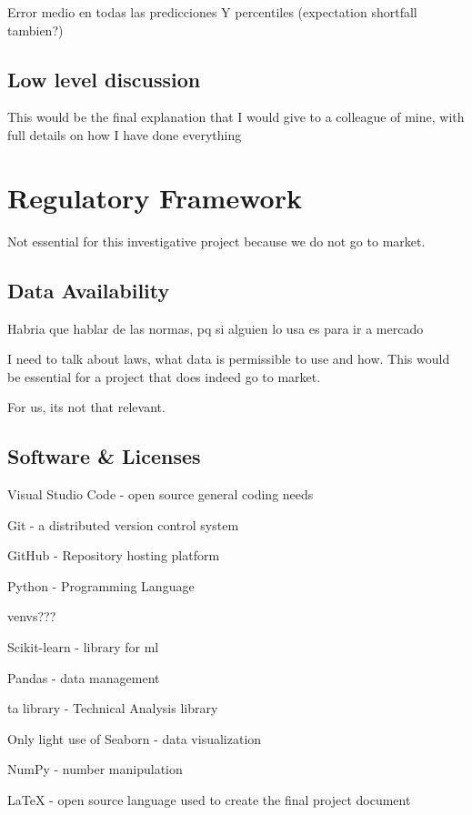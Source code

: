 \documentclass[12pt]{report} %
\begin{document}
Error medio en todas las predicciones
Y percentiles (expectation shortfall tambien?)

\section{Low level discussion} %
This would be the final explanation that I would give to a colleague of mine, with full details on how I have done everything



\chapter{Regulatory Framework}
Not essential for this investigative project because we do not go to market.
\section{Data Availability}
Habria que hablar de las normas, pq si alguien lo usa es para ir a mercado

I need to talk about laws, what data is permissible to use and how. This would be essential for a project that does indeed go to market.

For us, its not that relevant.

\section{Software \& Licenses}
Visual Studio Code - open source general coding needs \cite{vscode}

Git - a distributed version control system \cite{git}

GitHub - Repository hosting platform \cite{github}

Python - Programming Language \cite{python}

venvs??? \cite{python_venv}

Scikit-learn - library for ml \cite{scikit-learn}

Pandas - data management \cite{pandas}

ta library - Technical Analysis library\cite{ta-lib}

Only light use of Seaborn - data visualization \cite{seaborn}

NumPy - number manipulation \cite{numpy}

LaTeX - open source language used to create the final project document \cite{latex}
\end{document}

